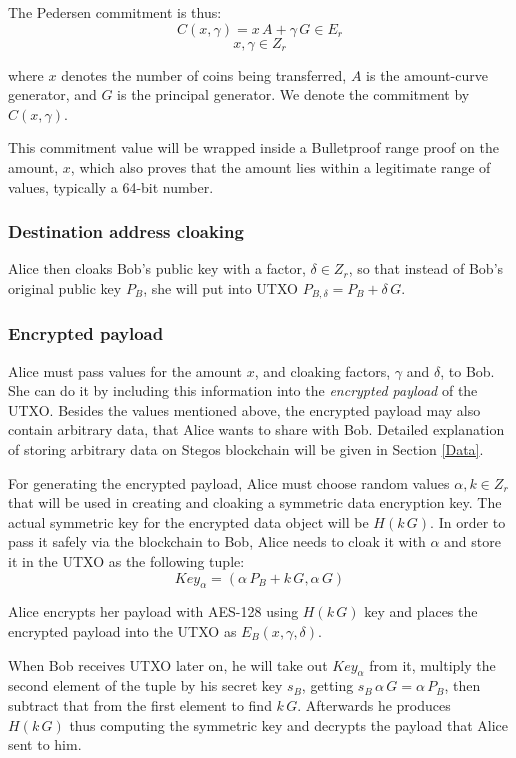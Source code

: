 \documentclass[8pt,fleqn,openany]{book}
\begin{document}
The Pedersen commitment is thus:
$$ C(x, \gamma) = x \, A + \gamma \, G \in E_r$$
$$x, \gamma \in Z_r$$

where $x$ denotes the number of coins being transferred, $A$ is the amount-curve generator, and $G$ is the principal generator. We denote the commitment by $C(x, \gamma)$. 

This commitment value will be wrapped inside a Bulletproof range proof on the amount, $x$, which also proves that the amount lies within a legitimate range of values, typically a 64-bit number.

\subsubsection{Destination address cloaking} Alice then cloaks Bob's public key with a factor, $\delta \in Z_r$, so that instead of Bob's original public key $P_B$, she will put into UTXO $P_{B, \delta} = P_B + \delta \, G$.


\subsubsection{Encrypted payload} Alice must pass values for the amount $x$, and cloaking factors, $\gamma$ and $\delta$, to Bob. She can do it by including this information into the \textit{encrypted payload} of the UTXO. Besides the values mentioned above, the encrypted payload may also contain arbitrary data, that Alice wants to share with Bob. Detailed explanation of storing arbitrary data on Stegos blockchain will be given in Section \ref{Data}. 

For generating the encrypted payload, Alice must choose random values $\alpha, k \in Z_r$ that will be used in creating and cloaking a symmetric data encryption key.
The actual symmetric key for the encrypted data object will be $H(k \, G)$. In order to pass it safely via the blockchain to Bob, Alice needs to cloak it with $\alpha$ and store it in the UTXO as the following tuple: $$\mathit{Key}_{\alpha} = (\alpha \, P_{B} + k \, G, \alpha \, G )$$ 

Alice encrypts her payload with AES-128 using $H(k \, G)$ key and places the encrypted payload into the UTXO as $E_B(x, \gamma, \delta)$.

When Bob receives UTXO later on, he will take out $\mathit{Key}_{\alpha}$ from it, multiply the second element of the tuple by his secret key $s_B$, getting $s_B \, \alpha \, G = \alpha \, P_B$, then subtract that from the first element to find $k \, G$. Afterwards he produces $H(k \, G)$ thus computing the symmetric key and decrypts the payload that Alice sent to him.
\end{document}
